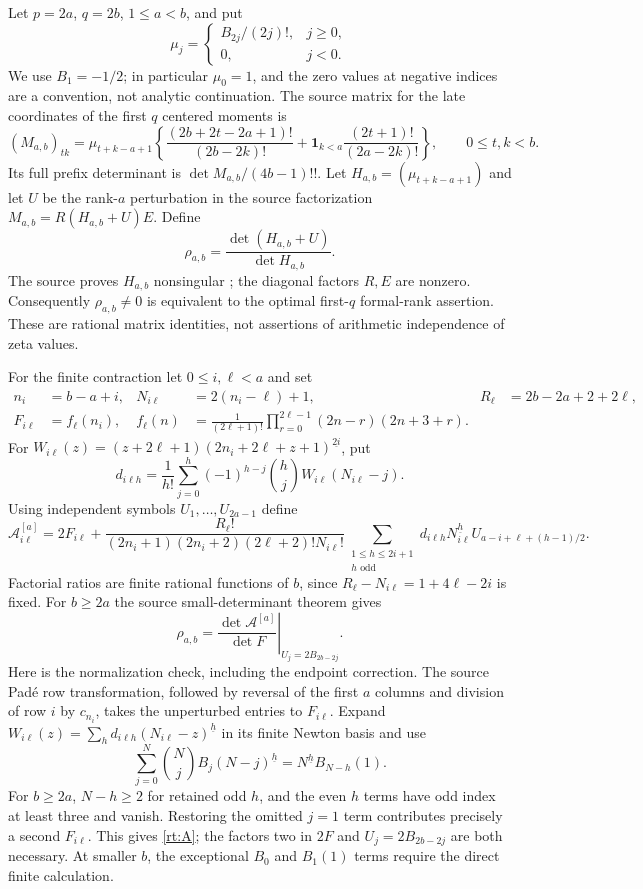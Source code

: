 Let $p=2a$, $q=2b$, $1\le a<b$, and put
\[
 \mu_j=\begin{cases}B_{2j}/(2j)!,&j\ge0,\\0,&j<0.\end{cases}
\]
We use $B_1=-1/2$; in particular $\mu_0=1$, and the zero values at negative indices are a convention, not analytic continuation.
The source matrix for the late coordinates of the first $q$ centered
moments is
\[
 (M_{a,b})_{tk}=\mu_{t+k-a+1}
 \left\{\frac{(2b+2t-2a+1)!}{(2b-2k)!}
  +\mathbf1_{k<a}\frac{(2t+1)!}{(2a-2k)!}\right\},
 \qquad 0\le t,k<b.
\]
Its full prefix determinant is $\det M_{a,b}/(4b-1)!!$. Let
$H_{a,b}=(\mu_{t+k-a+1})$ and let $U$ be the rank-$a$ perturbation
in the source factorization $M_{a,b}=R(H_{a,b}+U)E$. Define
\[
 \rho_{a,b}=\frac{\det(H_{a,b}+U)}{\det H_{a,b}}.
\]
The source proves $H_{a,b}$ nonsingular \cite{BTDsource}; the diagonal factors $R,E$
are nonzero. Consequently $\rho_{a,b}\ne0$ is equivalent to the
optimal first-$q$ formal-rank assertion. These are rational matrix
identities, not assertions of arithmetic independence of zeta values.

For the finite contraction let $0\le i,\ell<a$ and set
\begin{align*}
 n_i&=b-a+i,&N_{i\ell}&=2(n_i-\ell)+1,&R_\ell&=2b-2a+2+2\ell,\\
 F_{i\ell}&=f_\ell(n_i),&
 f_\ell(n)&=\frac1{(2\ell+1)!}
     \prod_{r=0}^{2\ell-1}(2n-r)(2n+3+r).
\end{align*}
For $W_{i\ell}(z)=(z+2\ell+1)
 (2n_i+2\ell+z+1)^{\underline{2i}}$, put
\[
 d_{i\ell h}=\frac1{h!}\sum_{j=0}^h
            (-1)^{h-j}\binom hj W_{i\ell}(N_{i\ell}-j).
\]
Using independent symbols $U_1,\ldots,U_{2a-1}$ define
\begin{equation}\label{rt:A}
 \mathcal A^{[a]}_{i\ell}
 =2F_{i\ell}+
 \frac{R_\ell!}
 {(2n_i+1)(2n_i+2)(2\ell+2)!N_{i\ell}!}
 \sum_{\substack{1\le h\le2i+1\\h\text{ odd}}}
 d_{i\ell h}N_{i\ell}^{\underline h}
 U_{a-i+\ell+(h-1)/2}.
\end{equation}
Factorial ratios are finite rational functions of $b$, since
$R_\ell-N_{i\ell}=1+4\ell-2i$ is fixed. For $b\ge2a$ the source
small-determinant theorem gives
\begin{equation}\label{rt:ratio}
 \rho_{a,b}=
 \left.\frac{\det\mathcal A^{[a]}}{\det F}
                    \right|_{U_j=2B_{2b-2j}}.
\end{equation}
Here is the normalization check, including the endpoint correction.
The source Pad\'e row transformation, followed by reversal of the
first $a$ columns and division of row $i$ by $c_{n_i}$, takes the
unperturbed entries to $F_{i\ell}$. Expand
$W_{i\ell}(z)=\sum_h d_{i\ell h}(N_{i\ell}-z)^{\underline h}$
in its finite Newton basis and use
\[
 \sum_{j=0}^N\binom Nj B_j(N-j)^{\underline h}
     =N^{\underline h}B_{N-h}(1).
\]
For $b\ge2a$, $N-h\ge2$ for retained odd $h$, and the even $h$
terms have odd index at least three and vanish. Restoring the
omitted $j=1$ term contributes precisely a second $F_{i\ell}$.
This gives \eqref{rt:A}; the factors two in $2F$ and
$U_j=2B_{2b-2j}$ are both necessary. At smaller $b$, the exceptional
$B_0$ and $B_1(1)$ terms require the direct finite calculation.

